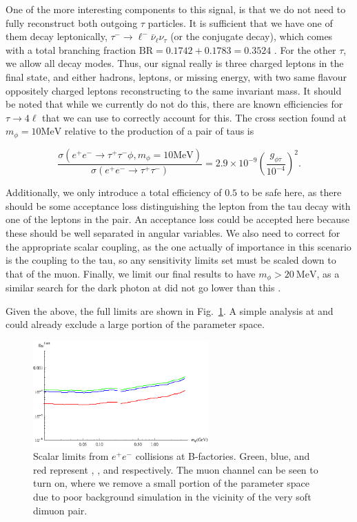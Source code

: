 One of the more interesting components to this signal, is that we do not need to fully reconstruct both outgoing $\tau$ particles.
It is sufficient that we have one of them decay leptonically, $\tau^- \rightarrow \ell^- \bar{\nu}_\ell \nu_\tau$ (or the conjugate decay), which comes with a total branching fraction $\textrm{BR} = 0.1742 + 0.1783 = 0.3524$ \cite{Agashe:2014kda}.
For the other $\tau$, we allow all decay modes.
Thus, our signal really is three charged leptons in the final state, and either hadrons, leptons, or missing energy, with two same flavour oppositely charged leptons reconstructing to the same invariant mass.
It should be noted that while we currently do not do this, there are known efficiencies for $\tau \rightarrow 4\ell$ that we can use to correctly account for this.
The cross section found at $m_\phi = 10\textrm{MeV}$ relative to the production of a pair of taus is

\begin{equation}
    \frac{\sigma\left(e^+ e^- \rightarrow \tau^+ \tau^- \phi, m_\phi = 10\textrm{MeV}\right)}{\sigma\left(e^+ e^- \rightarrow \tau^+ \tau^-\right)} = 2.9 \times 10^{-9} \left(\frac{g_{\phi\tau}}{10^{-4}}\right)^2\textrm{.}
\end{equation}

Additionally, we only introduce a total efficiency of $0.5$ to be safe here, as there should be some acceptance loss distinguishing the lepton from the tau decay with one of the leptons in the pair.
An acceptance loss could be accepted here because these should be well separated in angular variables.
We also need to correct for the appropriate scalar coupling, as the one actually of importance in this scenario is the coupling to the tau, so any sensitivity limits set must be scaled down to that of the muon.
Finally, we limit our final results to have $m_\phi > 20~\textrm{MeV}$, as a similar search for the dark photon at \babar did not go lower than this \cite{Lees:2014xha}.

Given the above, the full limits are shown in Fig.\ \ref{fig:ee_limits}.
A simple analysis at \babar and \belle could already exclude a large portion of the parameter space.

\begin{figure}[h]
    \centering
    \includegraphics[width=0.6\textwidth]{Figures/limits/ee_all}
    \caption{Scalar limits from $e^+ e^-$ collisions at B-factories. Green, blue, and red represent \babar, \belle, and \belletwo respectively. The muon channel can be seen to turn on, where we remove a small portion of the parameter space due to poor background simulation in the vicinity of the very soft dimuon pair.}
    \label{fig:ee_limits}
\end{figure}
